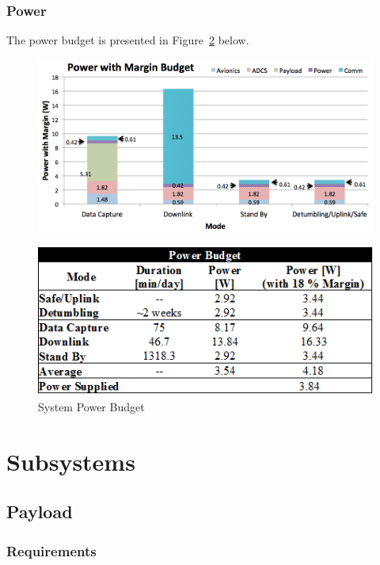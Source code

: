 \documentclass[12pt]{article}
\begin{document}
		\subsubsection{Power}
		The power budget is presented in Figure~\ref{fig:Mission_power2} below. 
			\begin{figure}[!ht]
				\centering
				\includegraphics[width=5in]{images/MissionOverview_4.png}
				\label{fig:Mission_power1}
			\end{figure}
			
			\begin{figure}[!ht]
				\centering
				\includegraphics[width=5in]{images/MissionOverview_6.png}
				\caption{System Power Budget}
				\label{fig:Mission_power2}
			\end{figure}
			
\section{Subsystems}
		\subsection{Payload}
			\subsubsection{Requirements}
\end{document}
